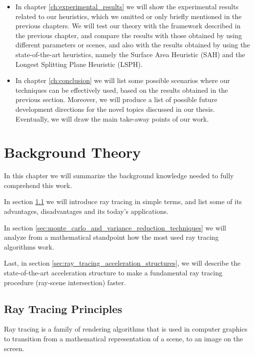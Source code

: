 \documentclass{PoliMi_MasterThesis}
\begin{document}
\begin{itemize}
	\item In chapter \ref{ch:experimental_results} we will show the experimental results related to our heuristics, which we omitted or only briefly mentioned in the previous chapters. We will test our theory with the framework described in the previous chapter, and compare the results with those obtained by using different parameters or scenes, and also with the results obtained by using the state-of-the-art heuristics, namely the Surface Area Heuristic (SAH) and the Longest Splitting Plane Heuristic (LSPH).
	\item In chapter \ref{ch:conclusion} we will list some possible scenarios where our techniques can be effectively used, based on the results obtained in the previous section. Moreover, we will produce a list of possible future development directions for the novel topics discussed in our thesis. Eventually, we will draw the main take-away points of our work.
\end{itemize}


\chapter{Background Theory}
\label{ch:background_theory}
In this chapter we will summarize the background knowledge needed to fully comprehend this work.

In section \ref{sec:ray_tracing_principles} we will introduce ray tracing in simple terms, and list some of its advantages, disadvantages and its today's applications.

In section \ref{sec:monte_carlo_and_variance_reduction_techniques} we will analyze from a mathematical standpoint how the most used ray tracing algorithms work.

Last, in section \ref{sec:ray_tracing_acceleration_structures}, we will describe the state-of-the-art acceleration structure to make a fundamental ray tracing procedure (ray-scene intersection) faster.

\section{Ray Tracing Principles} \label{sec:ray_tracing_principles}
Ray tracing is a family of rendering algorithms that is used in computer graphics to transition from a mathematical representation of a scene, to an image on the screen.
\end{document}
